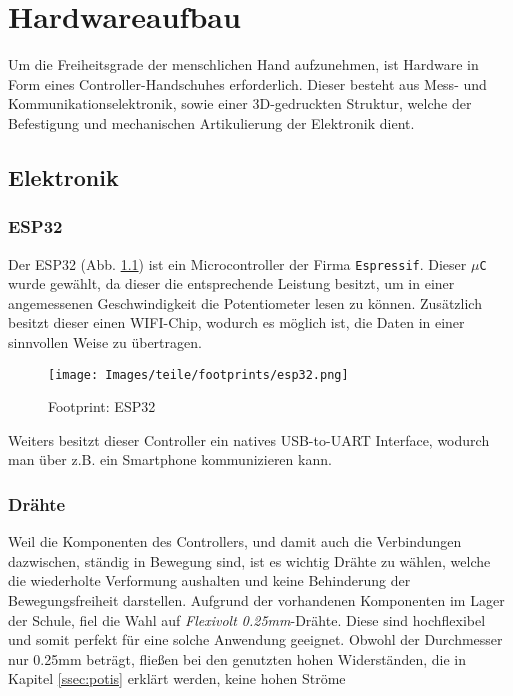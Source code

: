 \documentclass[paper=a4,12pt]{scrreprt}
\begin{document}

\chapter{Hardwareaufbau}%
\label{chap:Hardware}
Um die Freiheitsgrade der menschlichen Hand aufzunehmen, ist Hardware in Form eines
Controller-Handschuhes erforderlich. Dieser besteht aus Mess- und Kommunikationselektronik,
sowie einer 3D-gedruckten Struktur, welche der Befestigung und mechanischen Artikulierung der Elektronik dient.
\section{Elektronik}
\label{sec:Electronics}


\subsection{ESP32}
\label{ssec:ESP}

Der ESP32 (Abb. \ref{fig:esp32}) ist ein Microcontroller der Firma \texttt{Espressif}. Dieser \texttt{$\mu$C} wurde gewählt, da dieser die entsprechende
Leistung besitzt, um in einer angemessenen Geschwindigkeit die Potentiometer lesen zu können. Zusätzlich besitzt dieser einen WIFI-Chip, wodurch es möglich ist, die Daten in einer sinnvollen Weise zu übertragen.
\begin{figure}[H]
  \centering
  \texttt{[image: Images/teile/footprints/esp32.png]}
  \caption{Footprint: ESP32}
  \label{fig:esp32}
\end{figure}

Weiters besitzt dieser Controller ein natives USB-to-UART Interface, wodurch man über z.B. ein Smartphone kommunizieren kann.\newline

\subsection{Drähte}
\label{ssec:wires}
Weil die Komponenten des Controllers, und damit auch die Verbindungen dazwischen,
ständig in Bewegung sind, ist es wichtig Drähte zu wählen, welche die
wiederholte Verformung aushalten und keine Behinderung der Bewegungsfreiheit
darstellen. Aufgrund der vorhandenen Komponenten im Lager der Schule, fiel die 
Wahl auf \textit{Flexivolt 0.25mm}-Drähte. Diese sind hochflexibel und somit perfekt für 
eine solche Anwendung geeignet. Obwohl der Durchmesser nur 0.25mm beträgt, fließen bei 
den genutzten hohen Widerständen, die in Kapitel \ref{ssec:potis} erklärt 
werden, keine hohen Ströme 
\end{document}
